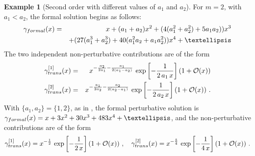 \documentclass[oneside]{amsart}
\theoremstyle{definition}
\newtheorem{example}[thm]{Example}
\newcommand{\bigO}{\mathcal{O}}
\begin{document}
\begin{example}[Second order with different values of $a_1$ and $a_2$]
\label{sec:degeneracy}
For $m=2$, with $a_1<a_2$, the formal solution begins as follows:
\begin{eqnarray*} \gamma_{\rm formal}(x)&=& x +(a_1+a_2) x^2 +(4(a_1^2+a_2^2)+5 a_1 a_2)) x^3 \\
 &&+(27 (a_1^3+a_2^3)+40(a_1^2 a_2+a_1 a_2^2)) x^4+\dots \end{eqnarray*}
The two independent non-perturbative contributions are of the form
\begin{eqnarray*} \gamma_{\rm trans}^{[1]}(x) &=& x^{-\frac{a_2}{2a_1}-\frac{a_1}{2(a_1-a_2)}}\, \exp\left[-\frac{1}{2\,a_1\, x}\right]\left(1+\bigO(x)\right) \\
 \gamma_{\rm trans}^{[2]}(x) &=& x^{-\frac{a_1}{2a_2}-\frac{a_2}{2(a_2-a_1)}}\, \exp\left[-\frac{1}{2\,a_2\, x}\right]\left(1+\bigO(x)\right) \,. \end{eqnarray*}
With $\{a_1, a_2\}=\{1,2\}$, as in \cite{BB}, the formal perturbative solution is $\gamma_{\rm formal}(x)= x+3x^2 +30x^3+483 x^4+ \dots$, and the non-perturbative contributions are of the form
\begin{eqnarray*} \gamma_{\rm trans}^{[1]}(x) = x^{-\frac{1}{2}}\, \exp\left[-\frac{1}{2\, x}\right] \left(1+\bigO(x)\right) \,, \quad \gamma_{\rm trans}^{[2]}(x) =x^{-\frac{5}{4}}\, \exp\left[-\frac{1}{4\, x}\right]\left(1+\bigO(x)\right)\,. \end{eqnarray*}
\end{example}
\end{document}
